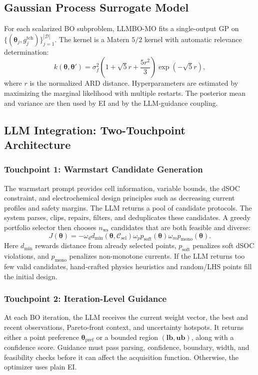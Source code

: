 \documentclass[journal]{IEEEtran}
\newcommand{\btheta}{\boldsymbol{\theta}}
\newcommand{\bD}{\mathcal{D}}
\begin{document}
\subsection{Gaussian Process Surrogate Model}

For each scalarized BO subproblem, LLMBO-MO fits a single-output GP on
$\{(\btheta_j,g_j^{\mathrm{tch}})\}_{j=1}^{|\bD|}$. The kernel is a Matern
$5/2$ kernel with automatic relevance determination:
\begin{equation}
k(\btheta,\btheta')=\sigma_f^2
\left(1+\sqrt{5}r+\frac{5r^2}{3}\right)\exp(-\sqrt{5}r),
\label{eq:matern}
\end{equation}
where $r$ is the normalized ARD distance. Hyperparameters are estimated by
maximizing the marginal likelihood with multiple restarts. The posterior mean
and variance are then used by EI and by the LLM-guidance coupling.

\subsection{LLM Integration: Two-Touchpoint Architecture}

\subsubsection{Touchpoint 1: Warmstart Candidate Generation}
The warmstart prompt provides cell information, variable bounds, the dSOC
constraint, and electrochemical design principles such as decreasing current
profiles and safety margins. The LLM returns a pool of candidate protocols.
The system parses, clips, repairs, filters, and deduplicates these candidates.
A greedy portfolio selector then chooses $n_{\mathrm{ws}}$ candidates that are
both feasible and diverse:
\begin{equation}
J(\btheta)=
-\omega_d d_{\min}(\btheta,\mathcal{C}_{\mathrm{sel}})
\omega_p p_{\mathrm{soft}}(\btheta)
\omega_m p_{\mathrm{mono}}(\btheta).
\label{eq:portfolio}
\end{equation}
Here $d_{\min}$ rewards distance from already selected points,
$p_{\mathrm{soft}}$ penalizes soft dSOC violations, and $p_{\mathrm{mono}}$
penalizes non-monotone currents. If the LLM returns too few valid candidates,
hand-crafted physics heuristics and random/LHS points fill the initial design.

\subsubsection{Touchpoint 2: Iteration-Level Guidance}
At each BO iteration, the LLM receives the current weight vector, the best and
recent observations, Pareto-front context, and uncertainty hotspots. It returns
either a point preference $\btheta_{\mathrm{pref}}$ or a bounded region
$(\mathbf{lb},\mathbf{ub})$, along with a confidence score. Guidance must pass
parsing, confidence, boundary, width, and feasibility checks before it can
affect the acquisition function. Otherwise, the optimizer uses plain EI.
\end{document}
